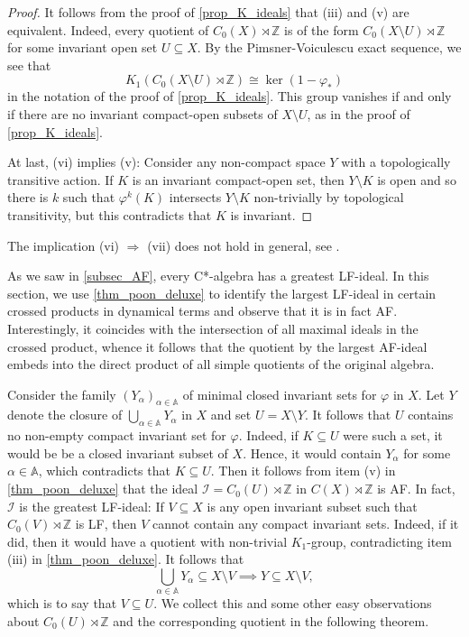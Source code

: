 \documentclass[12pt, a4paper, oneside]{amsart}
\newcommand{\0}{\mathbf{0}}
\newcommand{\1}{\mathbf{1}}
\newcommand{\Z}{\mathbb{Z}}   %
\newcommand{\bbA}{\mathbb{A}}   %
\newcommand{\I}{\mathscr{I}}
\begin{document}
\begin{proof}
		It follows from the proof of \cref{prop_K_ideals} that (iii) and (v) are equivalent. Indeed, every quotient of \(C_0(X) \rtimes  \Z\) is of the form \(C_0(X \setminus U) \rtimes  \Z\) for some invariant open set \(U \subseteq X\). By the Pimsner-Voiculescu exact sequence, we see that \[K_1(C_0(X \setminus U) \rtimes  \Z) \cong \ker(1 - \varphi_*)\] in the notation of the proof of \cref{prop_K_ideals}. This group vanishes if and only if there are no invariant compact-open subsets of \(X \setminus U\), as in the proof of \cref{prop_K_ideals}.
		
		At last, (vi) implies (v): Consider any non-compact space \(Y\) with a topologically transitive action. If \(K\) is an invariant compact-open set, then \(Y \setminus K\) is open and so there is \(k\) such that \(\varphi^k(K)\) intersects \(Y \setminus K\) non-trivially by topological transitivity, but this contradicts that \(K\) is invariant. 
	\end{proof}
	
	\begin{remark}
		The implication (vi) \(\Rightarrow\) (vii) does not hold in general, see \cite[Example 7.4]{akin}.
	\end{remark}
	
	As we saw in \cref{subsec_AF}, every C*-algebra has a greatest LF-ideal. In this section, we use \cref{thm_poon_deluxe} to identify the largest LF-ideal in certain crossed products in dynamical terms and observe that it is in fact AF. Interestingly, it coincides with the intersection of all maximal ideals in the crossed product, whence it follows that the quotient by the largest AF-ideal embeds into the direct product of all simple quotients of the original algebra. 
	
	Consider the family \((Y_\alpha)_{\alpha \in \bbA}\) of minimal closed invariant sets for \(\varphi\) in \(X\). Let \(Y\) denote the closure of \(\bigcup_{\alpha \in \bbA} Y_\alpha\) in \(X\) and set \(U = X \setminus Y\). It follows that \(U\) contains no non-empty compact invariant set for \(\varphi\). Indeed, if \(K \subseteq U\) were such a set, it would be be a closed invariant subset of \(X\). Hence, it would contain \(Y_\alpha\) for some \(\alpha \in \bbA\), which contradicts that \(K \subseteq U\). Then it follows from item (v) in \cref{thm_poon_deluxe} that the ideal \(\I=C_0(U) \rtimes \Z\) in \(C(X) \rtimes \Z\) is AF. In fact, \(\I\) is the greatest LF-ideal: If \(V \subseteq X\) is any open invariant subset such that \(C_0(V) \rtimes \Z\) is LF, then \(V\) cannot contain any compact invariant sets. Indeed, if it did, then it would have a quotient with non-trivial \(K_1\)-group, contradicting item (iii) in \cref{thm_poon_deluxe}. It follows that \[\bigcup_{\alpha \in \bbA} Y_\alpha \subseteq X \setminus V \implies Y \subseteq X \setminus V,\] which is to say that \(V \subseteq U\). We collect this and some other easy observations about \(C_0(U) \rtimes \Z\) and the corresponding quotient in the following theorem. 
	
\end{document}
